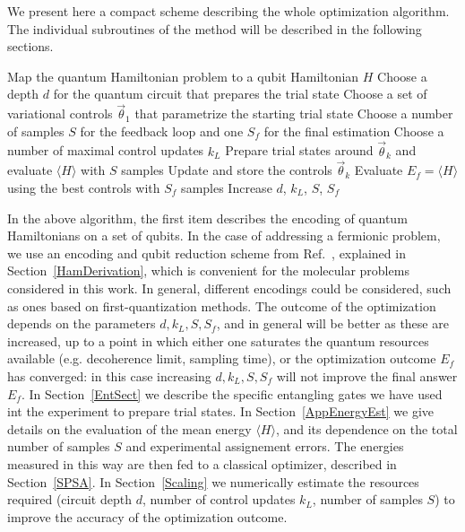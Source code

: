 \documentclass[twocolumn]{revtex4-1}
\newcommand{\1}{\mathbbm{1}}
\begin{document}
We present here a compact scheme describing the whole optimization algorithm. The individual subroutines of the method will be described in the following sections. 
\begin{algorithm}[H]
\caption{Hardware-efficient optimization of quantum Hamiltonian problems}
\begin{algorithmic}[1]
\State Map the quantum Hamiltonian problem to a qubit Hamiltonian $H$ 
\State Choose a depth $d$ for the quantum circuit that prepares the trial state
\State Choose a set of variational controls $\vec\theta_1$ that parametrize the starting trial state 
\State Choose a number of samples $S$ for the feedback loop and one $S_f$ for the final estimation
\State Choose a number of maximal control updates $k_L$
	 	\State Prepare trial states around $\vec\theta_k$ and evaluate $\langle H \rangle$ with $S$ samples 
	 	\State Update and store the controls $\vec\theta_k$
\EndFor
\State Evaluate $E_f=\langle H \rangle$ using the best controls with $S_f$ samples
\EndProcedure
\State Increase $d$, $k_L$, $S$, $S_f$
\EndWhile
{}
\end{algorithmic}
\end{algorithm}
In the above algorithm, the first item describes the encoding of quantum Hamiltonians on a set of qubits. In the case of addressing a fermionic problem, we use an encoding and qubit reduction scheme from Ref.~\cite{TaperingS}, explained in Section~\ref{HamDerivation}, which is convenient for the molecular problems considered in this work. In general, different encodings could be considered, such as ones based on first-quantization methods. The outcome of the optimization depends on the parameters $d, k_L, S, S_f$, and in general will be better as these are increased, up to a point in which either one saturates the quantum resources available (e.g. decoherence limit, sampling time), or the optimization outcome $E_f$ has converged: in this case increasing $d, k_L, S, S_f$ will not improve the final answer $E_f$. In Section~\ref{EntSect} we describe the specific entangling gates we have used int the experiment to prepare trial states. In Section~\ref{AppEnergyEst} we give details on the evaluation of the mean energy $\langle H\rangle$, and its dependence on the total number of samples $S$ and experimental assignement errors. The energies measured in this way are then fed to a classical optimizer, described in Section~\ref{SPSA}. In Section~\ref{Scaling} we numerically estimate the resources required (circuit depth $d$, number of control updates $k_L$, number of samples $S$) to improve the accuracy of the optimization outcome.        
\end{document}
